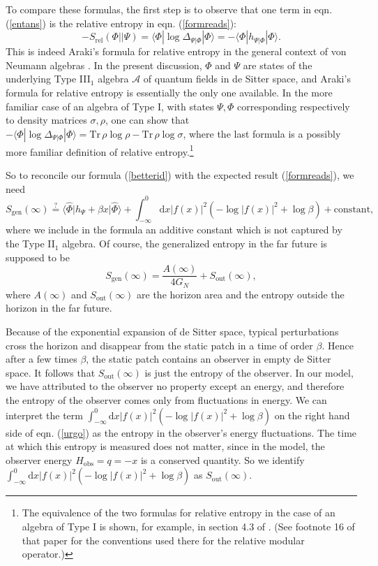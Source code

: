 \documentclass[11pt,a4paper]{article}
\def\be{\begin{equation}}
\def\ee{\end{equation}}
\def\h{\widehat}
\def\A{{\mathcal A}}
\def\d{{\mathrm d}}
\def\h{\widehat}
\def\rel{{\mathrm{rel}}}
\def\la{\langle}
\def\ra{\rangle}
\def\obs{{\mathrm{obs}}}
\def\Tr{{\mathrm{Tr}}}
\def\gen{{\mathrm{gen}}}
\def\out{{\mathrm{out}}}
\begin{document}
To compare these formulas, the first step is to observe that one term in eqn. (\ref{entans}) is the relative entropy in eqn. (\ref{formreads}):
\be\label{goodnews} -S_\rel(\Phi||\Psi) =\la\Phi|\log\Delta_{\Psi|\Phi}|\Phi\ra=-\la\Phi|h_{\Psi|\Phi}|\Phi\ra.\ee
This is indeed Araki's formula for relative entropy in the general context of von Neumann algebras \cite{ArakiThree}.   In the present discussion, $\Phi$ and $\Psi$
are states of the underlying Type III$_1$ algebra $\A$ of quantum fields in de Sitter space, and Araki's formula for relative entropy is essentially the only one available.
In the more familiar case of an algebra of Type I, with states $\Psi,\Phi$ corresponding respectively to density matrices $\sigma,\rho$, one
can show that $-\la\Phi|\log\Delta_{\Psi|\Phi}|\Phi\ra =\Tr\,\rho\log\rho-\Tr\,\rho\log\sigma$, where the last formula  is a possibly  more familiar
definition of relative entropy.\footnote{The equivalence of the two formulas for relative entropy in the case of
an algebra of Type I is shown, for example, in section 4.3 of \cite{WittenNotes}.
(See footnote 16 of that paper for the conventions used there for the relative modular operator.)}
 
 So to reconcile our formula (\ref{betterid}) with the expected result (\ref{formreads}), we need 
 \be\label{urgo}S_\gen(\infty)\overset{?}{=} \la \h\Phi|h_\Psi+\beta x|\h\Phi\ra +\int_{-\infty}^0\d x |f(x)|^2(-\log |f(x)|^2+\log\beta)+{\mathrm{constant}},\ee
 where we include in the formula an additive constant  which is not captured by the Type II$_1$ algebra.
 Of course, the generalized entropy in the far future is supposed to be
 \be\label{nurgo}S_\gen(\infty)=\frac{A(\infty)}{4G_N} + S_\out(\infty),\ee
 where $A(\infty)$ and $S_\out(\infty)$ are the horizon area and the entropy outside the horizon in the far future.   
 
 Because of the exponential expansion of de Sitter space, typical perturbations cross the horizon and disappear from the static patch in a time of order $\beta$.
 Hence after a few times $\beta$, the static patch contains an observer in empty de Sitter space.  It follows that $S_\out(\infty)$ is just the entropy of the observer.   
 In our model, we have attributed  to the observer no property except an energy, and therefore the entropy of the observer comes only from fluctuations in energy.
 We can interpret the term $\int_{-\infty}^0\d x |f(x)|^2(-\log |f(x)|^2+\log\beta)$ on the right hand side of eqn. (\ref{urgo}) as the entropy in the observer's energy
 fluctuations.   The time at which this entropy is measured does not matter, since in the model, the observer energy $H_\obs=q=-x$ is a conserved quantity.
 So we identify $\int_{-\infty}^0\d x |f(x)|^2(-\log |f(x)|^2+\log\beta)$ as $S_\out(\infty)$.   
 
\end{document}
